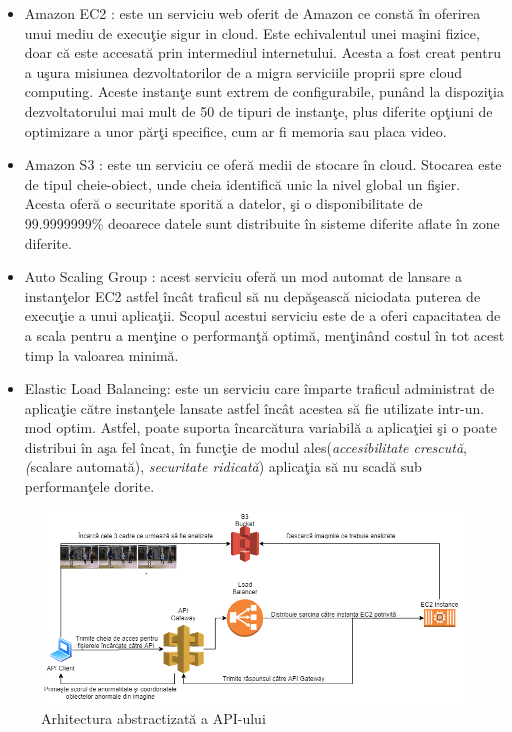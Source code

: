 \documentclass[a4paper,12pt]{report}
\begin{document}
\begin{itemize}
\item Amazon EC2 : este un serviciu web oferit de Amazon ce constă în oferirea unui mediu de execuţie sigur in cloud. Este echivalentul unei maşini fizice, doar că este accesată prin intermediul internetului. Acesta a fost creat pentru a uşura misiunea dezvoltatorilor de a migra serviciile proprii spre cloud computing.  Aceste instanţe sunt extrem de configurabile, punând la dispoziţia dezvoltatorului mai mult de 50 de tipuri de instanţe, plus diferite opţiuni de optimizare a unor părţi specifice, cum ar fi memoria sau placa video. \cite{2020EC2}
\item Amazon S3 : este un serviciu ce oferă medii de stocare în cloud. Stocarea este de tipul cheie-obiect, unde cheia identifică unic la nivel global un fişier. Acesta oferă o securitate sporită a datelor, şi o disponibilitate de 99.9999999\% deoarece datele sunt distribuite în sisteme diferite aflate în zone diferite.
\cite{2020S3}
\item Auto Scaling Group : acest serviciu oferă un mod automat de lansare a instanţelor EC2 astfel încât traficul să nu depăşească niciodata puterea de execuţie a unui aplicaţii. Scopul acestui serviciu este de a oferi capacitatea de a scala pentru a menţine o performanţă optimă, menţinând costul în tot acest timp la valoarea minimă.
\cite{2020autoscaling}
\item Elastic Load Balancing: este un serviciu care împarte traficul administrat de aplicaţie către instanţele lansate astfel încât acestea să fie utilizate intr-un. mod optim. Astfel, poate suporta încarcătura variabilă a aplicaţiei şi o poate distribui în aşa fel încat, în funcţie de modul ales(\emph {accesibilitate crescută}, \emph(scalare automată), \emph{securitate ridicată}) aplicaţia să nu scadă sub performanţele dorite.
\cite{2020elb}
\end{itemize}
\par 
\begin{figure}
\begin{center}
        \includegraphics[width=1\textwidth]{images/client_drawing}
			 \caption{Arhitectura abstractizată a API-ului}
			 \label{fig:client_design}
\end{center}
\end{figure}
\end{document}
